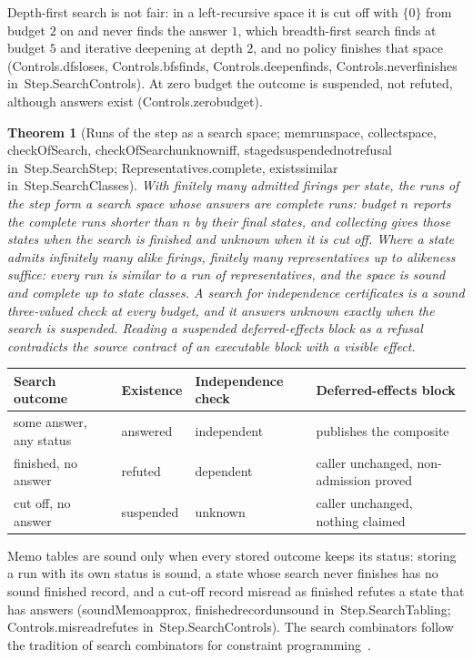 \documentclass[11pt]{article}
\newtheorem{theorem}{Theorem}
\theoremstyle{remark}
\newcommand{\lean}[1]{{\ttfamily\def\_{\textunderscore\allowbreak}#1}}
\newcommand{\inmod}[1]{in~{\ttfamily\def\_{\textunderscore\allowbreak}#1}}
\begin{document}
Depth-first search is not fair: in a left-recursive space it is cut off with $\{0\}$ from budget $2$ on and
never finds the answer $1$, which breadth-first search finds at budget $5$ and iterative deepening at depth
$2$, and no policy finishes that space (\lean{Controls.dfs\_loses}, \lean{Controls.bfs\_finds},
\lean{Controls.deepen\_finds}, \lean{Controls.never\_finishes} \inmod{Step.SearchControls}). At zero budget the
outcome is suspended, not refuted, although answers exist (\lean{Controls.zero\_budget}).

\begin{theorem}[Runs of the step as a search space; \lean{mem\_run\_space}, \lean{collect\_space}, \lean{checkOfSearch}, \lean{checkOfSearch\_unknown\_iff}, \lean{staged\_suspended\_not\_refusal} \inmod{Step.SearchStep}; \lean{Representatives.complete}, \lean{exists\_similar} \inmod{Step.SearchClasses}]
With finitely many admitted firings per state, the runs of the step form a search space whose answers
are complete runs: budget $n$ reports the complete runs shorter than $n$ by their final states, and
collecting gives those states when the search is finished and unknown when it is cut off. Where a state
admits infinitely many alike firings, finitely many representatives up to alikeness suffice: every run
is similar to a run of representatives, and the space is sound and complete up to state classes. A
search for independence certificates is a sound three-valued check at every budget, and it answers
unknown exactly when the search is suspended. Reading a suspended deferred-effects block as a refusal
contradicts the source contract of an executable block with a visible effect.
\end{theorem}

\begin{center}
\small
\begin{tabular}{@{}llll@{}}
\toprule
Search outcome & Existence & Independence check & Deferred-effects block \\
\midrule
some answer, any status & answered & independent & publishes the composite \\
finished, no answer & refuted & dependent & caller unchanged, non-admission proved \\
cut off, no answer & suspended & unknown & caller unchanged, nothing claimed \\
\bottomrule
\end{tabular}
\end{center}

Memo tables are sound only when every stored outcome keeps its status: storing a run with its own status
is sound, a state whose search never finishes has no sound finished record, and a cut-off record misread
as finished refutes a state that has answers (\lean{soundMemo\_approx}, \lean{finished\_record\_unsound}
\inmod{Step.SearchTabling}; \lean{Controls.misread\_refutes} \inmod{Step.SearchControls}). The search combinators
follow the tradition of search combinators for constraint programming~\cite{schrijvers13}.
\end{document}
